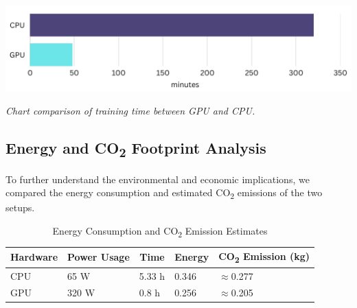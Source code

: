 \vspace{1em}
\begin{center} 
    \includegraphics[width=\textwidth]{../assets/07-results/graph-cpu-vs-gpu.png} 

    \small\textit{Chart comparison of training time between GPU and CPU.} 
\end{center}
\vspace{1em} 


\subsection{Energy and CO\textsubscript{2} Footprint Analysis}

To further understand the environmental and economic implications, we compared the energy 
consumption and estimated CO\textsubscript{2} emissions of the two setups.

\begin{table}[H]
\centering
\begin{tabular}{|c|c|c|c|c|}
    \hline
    \textbf{Hardware} & \textbf{Power Usage} & \textbf{Time} & \textbf{Energy} & 
    \textbf{CO\textsubscript{2} Emission (kg)} \\
    \hline
    \multicolumn{1}{|l|}{CPU} & 
    \multicolumn{1}{l|}{65 W} & 
    \multicolumn{1}{l|}{5.33 h} & 
    \multicolumn{1}{l|}{0.346} & 
    \multicolumn{1}{l|}{$\approx$0.277} \\
    \hline
    \multicolumn{1}{|l|}{GPU} & 
    \multicolumn{1}{l|}{320 W} & 
    \multicolumn{1}{l|}{0.8 h} & 
    \multicolumn{1}{l|}{0.256} & 
    \multicolumn{1}{l|}{$\approx$0.205} \\
    \hline
\end{tabular}
\caption{Energy Consumption and CO\textsubscript{2} Emission Estimates}
\end{table}

